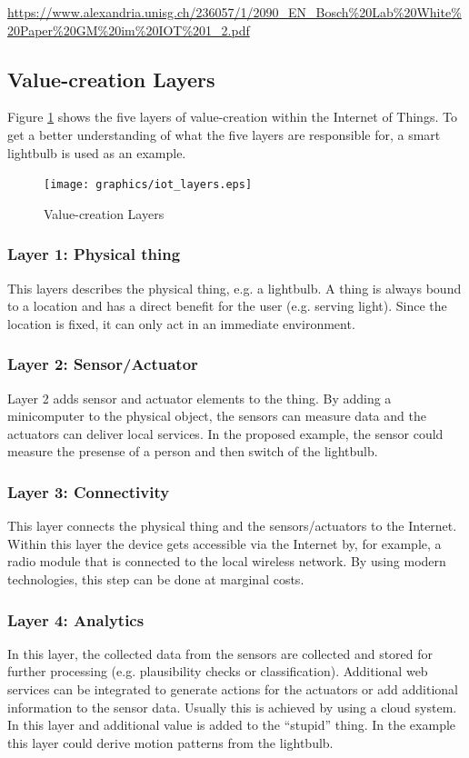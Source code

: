 \url{https://www.alexandria.unisg.ch/236057/1/2090_EN_Bosch%20Lab%20White%20Paper%20GM%20im%20IOT%201_2.pdf}
\subsection{Value-creation Layers}

Figure \ref{fig:value_creation_layers} shows the five layers of value-creation within the Internet of Things. To get a better understanding of what the five layers are responsible for, a smart lightbulb is used as an example.

\begin{figure}[h]
	\centering
		\texttt{[image: graphics/iot\_layers.eps]}
	\caption{Value-creation Layers\cite{iotfleisch}}
	\label{fig:value_creation_layers}
\end{figure}

\subsubsection{Layer 1: Physical thing}
This layers describes the physical thing, e.g. a lightbulb. A thing is always bound to a location and has a direct benefit for the user (e.g. serving light). Since the location is fixed, it can only act in an immediate environment.

\subsubsection{Layer 2: Sensor/Actuator}
Layer 2 adds sensor and actuator elements to the thing. By adding a minicomputer to the physical object, the sensors can measure data and the actuators can deliver local services. In the proposed example, the sensor could measure the presense of a person and then switch of the lightbulb.

\subsubsection{Layer 3: Connectivity}
This layer connects the physical thing and the sensors/actuators to the Internet. Within this layer the device gets accessible via the Internet by, for example, a radio module that is connected to the local wireless network. By using modern technologies, this step can be done at marginal costs.

\subsubsection{Layer 4: Analytics}
In this layer, the collected data from the sensors are collected and stored for further processing (e.g. plausibility checks or classification). Additional web services can be integrated to generate actions for the actuators or add additional information to the sensor data. Usually this is achieved by using a cloud system. In this layer and additional value is added to the ``stupid'' thing. In the example this layer could derive motion patterns from the lightbulb.

